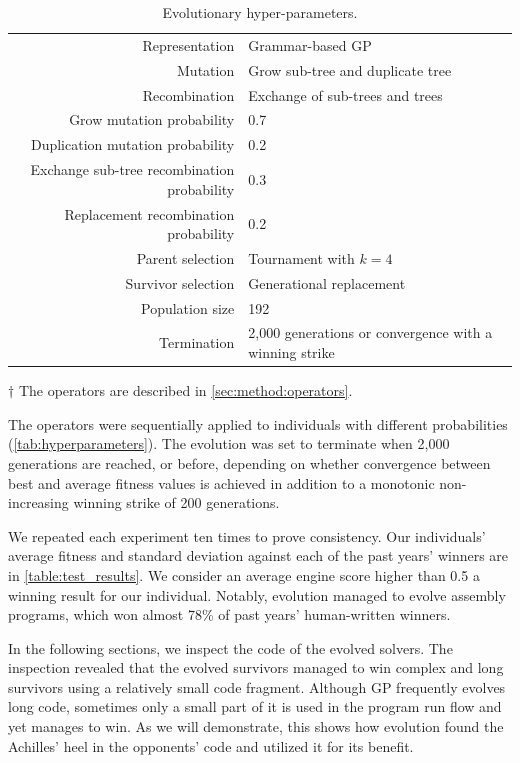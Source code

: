 \documentclass[dvipsnames, format=sigconf]{acmart}
\begin{document}
\begin{table}
\caption{Evolutionary hyper-parameters.}
\label{tab:hyperparameters}
\centering
\begin{threeparttable}
\renewcommand{\arraystretch}{1.3}
\begin{tabular}[t]{R{95px}|p{125px}}
Representation & Grammar-based GP \\
Mutation & Grow sub-tree and duplicate tree \tnote{$\dagger$} \\
Recombination & Exchange of sub-trees and trees \tnote{$\dagger$} \\
Grow mutation probability & 0.7\\
Duplication mutation probability & 0.2\\
Exchange sub-tree recombination probability & 0.3\\
Replacement recombination probability & 0.2\\
Parent selection & Tournament with $k=4$\\
Survivor selection & Generational replacement\\
Population size & 192\\
Termination & 2,000 generations or convergence with a winning strike
\end{tabular}
\renewcommand{\arraystretch}{1}
\begin{tablenotes}
\item[$\dagger$] The operators are described in \autoref{sec:method:operators}.
\end{tablenotes}
\end{threeparttable}
\end{table}

The operators were sequentially applied to individuals with different probabilities (\autoref{tab:hyperparameters}). 
The evolution was set to terminate when 2,000 generations are reached, or before, depending on whether convergence between best and average fitness values is achieved in addition to a monotonic non-increasing winning strike of 200 generations.

We repeated each experiment ten times to prove consistency. Our individuals' average fitness and standard deviation against each of the past years' winners are in \autoref{table:test_results}. We consider an average engine score higher than 0.5 a winning result for our individual. Notably, evolution managed to evolve assembly programs, which won almost 78\% of past years' human-written winners.

In the following sections, we inspect the code of the evolved solvers. The inspection revealed that the evolved survivors managed to win complex and long survivors using a relatively small code fragment. Although GP frequently evolves long code, sometimes only a small part of it is used in the program run flow and yet manages to win. As we will demonstrate, this shows how evolution found the Achilles' heel in the opponents' code and utilized it for its benefit.
\end{document}

